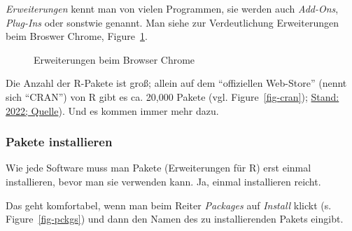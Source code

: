 \documentclass[
  letterpaper,
  DIV=11,
  numbers=noendperiod]{scrartcl}
\theoremstyle{definition}
\theoremstyle{definition}
\theoremstyle{definition}
\theoremstyle{remark}
\begin{document}
\emph{Erweiterungen} kennt man von vielen Programmen, sie werden auch
\emph{Add-Ons}, \emph{Plug-Ins} oder sonstwie genannt. Man siehe zur
Verdeutlichung Erweiterungen beim Broswer Chrome,
Figure~\ref{fig-chrome}.

\begin{figure}


\caption{\label{fig-chrome}Erweiterungen beim Browser Chrome}

\end{figure}%

Die Anzahl der R-Pakete ist groß; allein auf dem ``offiziellen
Web-Store'' (nennt sich ``CRAN'') von R gibt es ca. 20,000 Pakete (vgl.
Figure~\ref{fig-cran});
\href{https://gist.github.com/daroczig/3cf06d6db4be2bbe3368}{Stand:
2022; Quelle}). Und es kommen immer mehr dazu.

\subsubsection{Pakete installieren}\label{install-r-pckgs}

Wie jede Software muss man Pakete (Erweiterungen für R) erst einmal
installieren, bevor man sie verwenden kann. Ja, einmal installieren
reicht.

Das geht komfortabel, wenn man beim Reiter \emph{Packages} auf
\emph{Install} klickt (s. Figure~\ref{fig-pckgs}) und dann den Namen des
zu installierenden Pakets eingibt.
\end{document}
